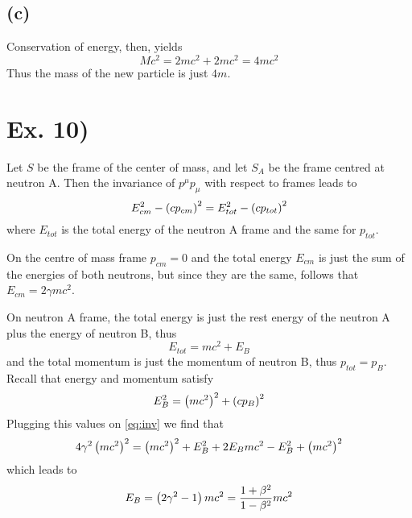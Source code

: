 \documentclass[oneside, 10pt, notitlepage]{book}
\begin{document}
\subsection*{(c)}
Conservation of energy, then, yields
\begin{equation}
    M c^2 = 2 m c^2 + 2 m c^2 = 4 m c^2
\end{equation}
Thus the mass of the new particle is just \(4 m\).

\section*{Ex. 10)}

Let \(S\) be the frame of the center of mass, and let \(S_A\) be the frame centred at neutron A. Then the invariance of \(p^{\mu}p_{\mu}\) with respect to frames leads to 
\begin{equation}\label{eq:inv}
    E_{cm}^2 - \left(cp_{cm}\right)^2 = E_{tot}^2 - \left(c p_{tot}\right)^2
\end{equation}
where \(E_{tot}\) is the total energy of the neutron A frame and the same for \(p_{tot}\).

On the centre of mass frame \(p_{cm}=0\) and the total energy \(E_{cm}\) is just the sum of the energies of both neutrons, but since they are the same, follows that \(E_{cm}= 2 \gamma m c^2\).

On neutron A frame, the total energy is just the rest energy of the neutron A plus the energy of neutron B, thus
\begin{equation}
    E_{tot} = mc^2 + E_B
\end{equation}
and the total momentum is just the momentum of neutron B, thus \(p_{tot} = p_B\). Recall that energy and momentum satisfy
\begin{equation}
    E_B^2 = \left(mc^2\right)^2 + \left(cp_B\right)^2
\end{equation}
Plugging this values on \eqref{eq:inv} we find that
\begin{equation}
    4 \gamma^2 \left(mc^2\right)^2 = \left(mc^2\right)^2 + E_B^2 + 2 E_B mc^2 - E_B^2 + \left(mc^2\right)^2
\end{equation}
which leads to 
\begin{equation}
    E_B = \left(2\gamma^2-1\right) mc^2 = \frac{1+\beta^2}{1-\beta^2}mc^2
\end{equation}


\end{document}

